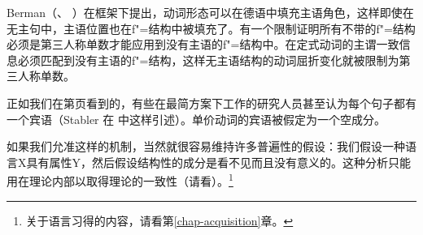 Berman（\citeyear[]{Berman99a}、
\citeyear[\S~4]{Berman2003a}）在\lfgc 框架下提出，动词形态可以在德语中填充主语角色，这样即使在无主句中，主语位置也在f"=结构中被填充了。有一个限制证明所有不带\predvc 的f"=结构必须是第三人称单数才能应用到没有主语的f"=结构中。在定式动词的主谓一致信息必须匹配到没有主语的f"=结构，这样无主语结构的动词屈折变化就被限制为第三人称单数\citep{Berman99a}。

正如我们在第\pageref{Seite-leeres-Objekt}页看到的，有些在最简方案下工作的研究人员甚至认为每个句子都有一个宾语（Stabler 在
 \citet[, 124]{Veenstra98a}中这样引述）。单价动词的宾语被假定为一个空成分。
 
如果我们允准这样的机制，当然就很容易维持许多普遍性的假设：我们假设一种语言X具有属性Y，然后假设结构性的成分是看不见而且没有意义的。这种分析只能用在理论内部以取得理论的一致性（请看\citealp[\S~2.1.2]{CJ2005a}）。\footnote{%
 关于语言习得的内容，请看第\ref{chap-acquisition}章。
 }

